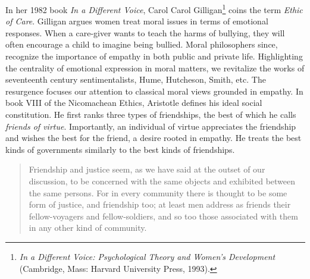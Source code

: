 \documentclass[phdthesis,12pt,final]{wuthesis}
\theoremstyle{definition}
\theoremstyle{definition}
\theoremstyle{definition}
\theoremstyle{definition}
\theoremstyle{remark}
\begin{document}
In her 1982 book \emph{In a Different Voice}, Carol Carol Gilligan\footnote{\emph{In a Different Voice: Psychological Theory and Women's Development} (Cambridge, Mass: Harvard University Press, 1993).} coins the term \emph{Ethic of Care}. Gilligan argues women treat moral issues in terms of emotional responses. When a care-giver wants to teach the harms of bullying, they will often encourage a child to imagine being bullied. Moral philosophers since, recognize the importance of empathy in both public and private life. Highlighting the centrality of emotional expression in moral matters, we revitalize the works of seventeenth century sentimentalists, Hume, Hutcheson, Smith, etc. The resurgence focuses our attention to classical moral views grounded in empathy. In book VIII of the Nicomachean Ethics, Aristotle defines his ideal social constitution. He first ranks three types of friendships, the best of which he calls \emph{friends of virtue}. Importantly, an individual of virtue appreciates the friendship and wishes the best for the friend, a desire rooted in empathy. He treats the best kinds of governments similarly to the best kinds of friendships.

\begin{quote}
Friendship and justice seem, as we have said at the outset of our discussion, to be concerned with the same objects and exhibited between the same persons. For in every community there is thought to be some form of justice, and friendship too; at least men address as friends their fellow-voyagers and fellow-soldiers, and so too those associated with them in any other kind of community.
\end{quote}
\end{document}
